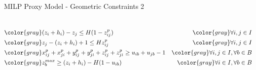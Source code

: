 \documentclass{beamer}
\begin{document}
\begin{frame}{MILP Proxy Model - Geometric Constraints 2}
\begin{columns}[onlytextwidth,T]
{\begin{minipage}{\linewidth}
\begin{align}
                                         & \color{gray} (z_i + h_i) - z_j\le H(1 - z^p_{ij})                                                     & \color{gray} \forall i,j \in I \notag \\
                                         & \color{gray} z_j - (z_i + h_i) + 1 \le H z^p_{ij}                                                     & \color{gray} \forall i,j \in I \notag \\
                                         & \color{gray} x^p_{ij} + x^p_{ji} + y^p_{ij} + y^p_{ji} + z^p_{ij} + z^p_{ji} \ge u_{ib} + u_{jb} - 1  & \color{gray} \forall i,j \in I, \forall b \in B \notag \\
                                         & \color{gray} z^{max}_b \ge (z_i + h_i) - H(1-u_{ib})                                                  & \color{gray} \forall i \in I, \forall b \in B \notag
                    \end{align}
                \end{minipage}
            }
            \end{columns}
    \end{frame}
\end{document}
